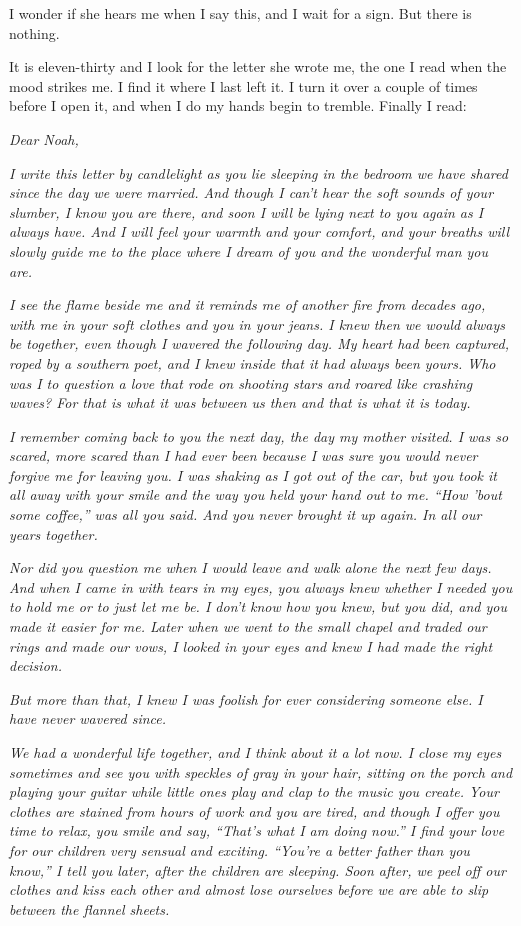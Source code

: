 \documentclass[10pt, twoside, openright]{book}
\begin{document}
I wonder if she hears me when I say this, and I wait for a sign. But
there is nothing.

It is eleven-thirty and I look for the letter she wrote me, the one I
read when the mood strikes me. I find it where I last left it. I turn it
over a couple of times before I open it, and when I do my hands begin to
tremble. Finally I read:


\emph{Dear Noah,}

\emph{I write this letter by candlelight as you lie sleeping in the
bedroom we have shared since the day we were married. And though I can't
hear the soft sounds of your slumber, I know you are there, and soon I
will be lying next to you again as I always have. And I will feel your
warmth and your comfort, and your breaths will slowly guide me to the
place where I dream of you and the wonderful man you are.}

\emph{I see the flame beside me and it reminds me of another fire from
decades ago, with me in your soft clothes and you in your jeans. I knew
then we would always be together, even though I wavered the following
day. My heart had been captured, roped by a southern poet, and I knew
inside that it had always been yours. Who was I to question a love that
rode on shooting stars and roared like crashing waves? For that is what
it was between us then and that is what it is today.}

\emph{I remember coming back to you the next day, the day my mother
visited. I was so scared, more scared than I had ever been because I was
sure you would never forgive me for leaving you. I was shaking as I got
out of the car, but you took it all away with your smile and the way you
held your hand out to me. ``How 'bout some coffee,'' was all you said.
And you never brought it up again. In all our years together.}

\emph{Nor did you question me when I would leave and walk alone the next
few days. And when I came in with tears in my eyes, you always knew
whether I needed you to hold me or to just let me be. I don't know how
you knew, but you did, and you made it easier for me. Later when we went
to the small chapel and traded our rings and made our vows, I looked in
your eyes and knew I had made the right decision.}

\emph{But more than that, I knew I was foolish for ever considering
someone else. I have never wavered since.}

\emph{We had a wonderful life together, and I think about it a lot now.
I close my eyes sometimes and see you with speckles of gray in your
hair, sitting on the porch and playing your guitar while little ones
play and clap to the music you create. Your clothes are stained from
hours of work and you are tired, and though I offer you time to relax,
you smile and say, ``That's what I am doing now.'' I find your love for
our children very sensual and exciting. ``You're a better father than
you know,'' I tell you later, after the children are sleeping. Soon
after, we peel off our clothes and kiss each other and almost lose
ourselves before we are able to slip between the flannel sheets.}
\end{document}
